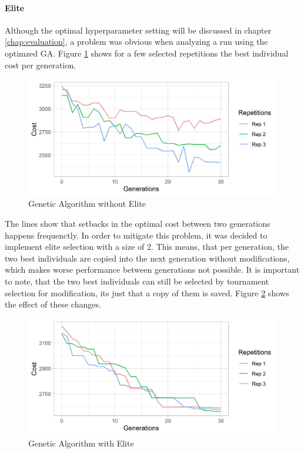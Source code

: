 \paragraph{Elite}
Although the optimal hyperparameter setting will be discussed in chapter \ref{chap:evaluation}, a problem was obvious when analyzing a run using the optimzed GA. Figure \ref{figure:no_elite} shows for a few selected repetitions the best individual cost per generation.

\begin{figure}[ht] 
	\label{figure:no_elite}
	\includegraphics[width=1\linewidth]{simulations/evaluation/plots/ga_no_elite_generations}
	\caption{Genetic Algorithm without Elite}
\end{figure}

The lines show that setbacks in the optimal cost between two generations happens frequenctly. In order to mitigate this problem, it was decided to implement elite selection with a size of 2. This means, that per generation, the two best individuals are copied into the next generation without modifications, which makes worse performance between generations not possible. It is important to note, that the two best individuals can still be selected by tournament selection for modification, its just that a copy of them is saved. Figure \ref{figure:with_elite} shows the effect of these changes.

\begin{figure}[ht] 
	\label{figure:with_elite}
	\includegraphics[width=1\linewidth]{simulations/evaluation/plots/ga_elite_generations}
	\caption{Genetic Algorithm with Elite}
\end{figure}


